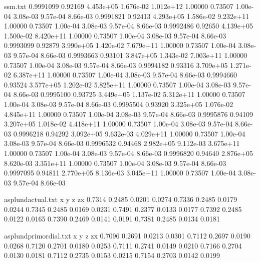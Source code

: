 \begin{filecontents}{ssm.txt}
0.9991099 0.92169 4.453e+05 1.676e-02 1.012e+12 1.00000 0.73507 1.00e-04 3.08e-03 9.57e-04 8.66e-03
0.9991821 0.92413 4.293e+05 1.586e-02 9.232e+11 1.00000 0.73507 1.00e-04 3.08e-03 9.57e-04 8.66e-03
0.9992486 0.92650 4.139e+05 1.500e-02 8.420e+11 1.00000 0.73507 1.00e-04 3.08e-03 9.57e-04 8.66e-03
0.9993099 0.92879 3.990e+05 1.420e-02 7.679e+11 1.00000 0.73507 1.00e-04 3.08e-03 9.57e-04 8.66e-03
0.9993663 0.93101 3.847e+05 1.343e-02 7.003e+11 1.00000 0.73507 1.00e-04 3.08e-03 9.57e-04 8.66e-03
0.9994182 0.93316 3.709e+05 1.271e-02 6.387e+11 1.00000 0.73507 1.00e-04 3.08e-03 9.57e-04 8.66e-03
0.9994660 0.93524 3.577e+05 1.202e-02 5.825e+11 1.00000 0.73507 1.00e-04 3.08e-03 9.57e-04 8.66e-03
0.9995100 0.93725 3.449e+05 1.137e-02 5.312e+11 1.00000 0.73507 1.00e-04 3.08e-03 9.57e-04 8.66e-03
0.9995504 0.93920 3.325e+05 1.076e-02 4.845e+11 1.00000 0.73507 1.00e-04 3.08e-03 9.57e-04 8.66e-03
0.9995876 0.94109 3.207e+05 1.018e-02 4.418e+11 1.00000 0.73507 1.00e-04 3.08e-03 9.57e-04 8.66e-03
0.9996218 0.94292 3.092e+05 9.632e-03 4.029e+11 1.00000 0.73507 1.00e-04 3.08e-03 9.57e-04 8.66e-03
0.9996532 0.94468 2.982e+05 9.112e-03 3.675e+11 1.00000 0.73507 1.00e-04 3.08e-03 9.57e-04 8.66e-03
0.9996820 0.94640 2.876e+05 8.620e-03 3.351e+11 1.00000 0.73507 1.00e-04 3.08e-03 9.57e-04 8.66e-03
0.9997095 0.94811 2.770e+05 8.136e-03 3.045e+11 1.00000 0.73507 1.00e-04 3.08e-03 9.57e-04 8.66e-03
\end{filecontents}

\begin{filecontents}{asplundactual.txt}
x y z zx
0.7314 0.2485 0.0201 0.0274
0.7336 0.2485 0.0179 0.0244
0.7345 0.2485 0.0169 0.0231
0.7491 0.2377 0.0133 0.0177
0.7392 0.2485 0.0122 0.0165
0.7390 0.2469 0.0141 0.0191
0.7381 0.2485 0.0134 0.0181
\end{filecontents}

\begin{filecontents}{asplundprimordial.txt}
x y z zx
0.7096 0.2691 0.0213 0.0301
0.7112 0.2697 0.0190 0.0268
0.7120 0.2701 0.0180 0.0253
0.7111 0.2741 0.0149 0.0210
0.7166 0.2704 0.0130 0.0181
0.7112 0.2735 0.0153 0.0215
0.7154 0.2703 0.0142 0.0199
\end{filecontents}